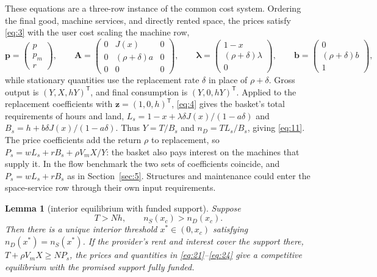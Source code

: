 \documentclass[12pt]{article}
\theoremstyle{plain}
\newtheorem{lemma}[proposition]{Lemma}
\begin{document}
These equations are a three-row instance of the common cost system. Ordering the final good, machine services, and directly rented space, the prices satisfy \eqref{eq:3} with the user cost scaling the machine row,
\[
\mathbf{p}=\begin{pmatrix}p\\p_m\\r\end{pmatrix},\qquad
\mathbf{A}=\begin{pmatrix}0&J(x)&0\\0&(\rho+\delta)a&0\\0&0&0\end{pmatrix},\qquad
\boldsymbol{\lambda}=\begin{pmatrix}1-x\\(\rho+\delta)\lambda\\0\end{pmatrix},\qquad
\mathbf{b}=\begin{pmatrix}0\\(\rho+\delta)b\\1\end{pmatrix},
\]
while stationary quantities use the replacement rate $\delta$ in place of $\rho+\delta$. Gross output is $(Y,X,hY)^{\mathsf{T}}$, and final consumption is $(Y,0,hY)^{\mathsf{T}}$. Applied to the replacement coefficients with $\mathbf{z}=(1,0,h)^{\mathsf{T}}$, \eqref{eq:4} gives the basket's total requirements of hours and land, $L_s=1-x+\lambda\delta J(x)/(1-a\delta)$ and $B_s=h+b\delta J(x)/(1-a\delta)$. Thus $Y=T/B_s$ and $n_D=TL_s/B_s$, giving \eqref{eq:11}. The price coefficients add the return $\rho$ to replacement, so $P_s=wL_s+rB_s+\rho V_mX/Y$: the basket also pays interest on the machines that supply it. In the flow benchmark the two sets of coefficients coincide, and $P_s=wL_s+rB_s$ as in Section~\ref{sec:5}. Structures and maintenance could enter the space-service row through their own input requirements.

\begin{lemma}[interior equilibrium with funded support]\label{lem:B.1}
Suppose
\begin{equation}\label{eq:25}
T>Nh,\qquad
n_S(x_c)>n_D(x_c).
\end{equation}
Then there is a unique interior threshold $x^*\in(0,x_c)$ satisfying $n_D(x^*)=n_S(x^*)$. If the provider's rent and interest cover the support there, $T+\rho V_mX\ge NP_s$, the prices and quantities in \eqref{eq:21}--\eqref{eq:24} give a competitive equilibrium with the promised support fully funded.
\end{lemma}
\end{document}
